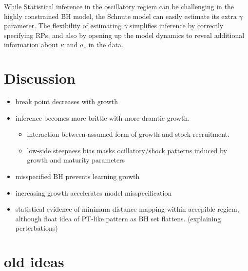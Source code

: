%
While Statistical inference in the oscillatory regiem can be challenging in
the highly constrained BH model, the Schnute model can easily estimate its extra
$\gamma$ parameter. The flexibility of estimating $\gamma$ simplifies inference by 
correctly specifying RPs, and also by opening up the model dynamics to reveal
additional information about $\kappa$ and $a_s$ in the data. %


%
\clearpage
\section{Discussion}

\begin{itemize}
        \item break point decreases with growth
        \item inference becomes more brittle with more dramtic growth.
        \begin{itemize}
                \item interaction between assumed form of growth and stock recruitment.
                \item low-side steepness bias masks ocillatory/shock patterns induced by growth and maturity parameters
        \end{itemize}
        \item misspecified BH prevents learning growth
        \item increasing growth accelerates model misspecification
        \item statistical evidence of minimum distance mapping within accepible regiem, although float idea of PT-like pattern as BH set flattens. (explaining perterbations)
\end{itemize}

%
\section{old ideas}

